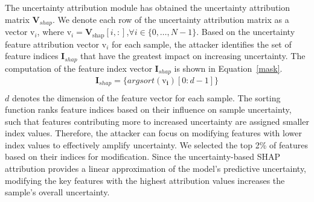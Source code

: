 \documentclass[conference,compsoc]{IEEEtran} %
\begin{document}
The uncertainty attribution module has obtained the uncertainty attribution matrix $\bm{V}_{shap}$.
We denote each row of the uncertainty attribution matrix as a vector $\bm{\mathrm{v}}_{i}$, where $\bm{\mathrm{v}}_{i} =\bm{V}_{\text{shap}}[i,:]$,$\forall i \in \{0, \dots, N-1 \}$.
Based on the uncertainty feature attribution vector $\bm{\mathrm{v}}_{i}$ for each sample, the attacker identifies the set of feature indices $\bm{I}_{shap}$ that have the greatest impact on increasing uncertainty.
The computation of the feature index vector $\bm{I}_{shap}$ is shown in Equation~\ref{mask}.
\begin{equation}
	\begin{aligned}
		\bm{I}_{shap} = \{ argsort(\bm{\mathrm{v}_{i}})[0:d-1]  \} \\
		\end{aligned}
	\label{mask}
\end{equation}
$d$ denotes the dimension of the feature vector for each sample.
The sorting function ranks feature indices based on their influence on sample uncertainty, such that features contributing more to increased uncertainty are assigned smaller index values.  
Therefore, the attacker can focus on modifying features with lower index values to effectively amplify uncertainty.
We selected the top 2\% of features based on their indices for modification.
Since the uncertainty-based SHAP attribution provides a linear approximation of the model's predictive uncertainty, modifying the key features with the highest attribution values increases the sample's overall uncertainty.
\end{document}
